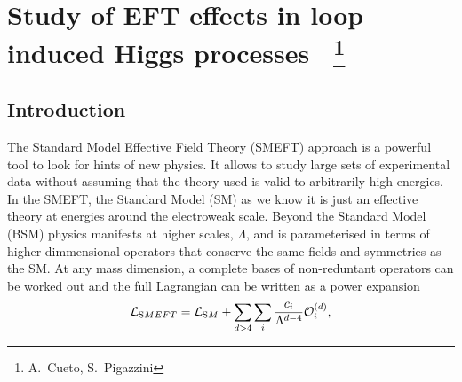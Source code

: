 \newcommand{\Herwig}{H\protect\scalebox{0.8}{ERWIG}\xspace}
\newcommand{\Pythia}{P\protect\scalebox{0.8}{YTHIA}\xspace}
\newcommand{\Sherpa}{S\protect\scalebox{0.8}{HERPA}\xspace}
\newcommand{\Rivet}{R\protect\scalebox{0.8}{IVET}\xspace}
\newcommand{\Professor}{P\protect\scalebox{0.8}{ROFESSOR}\xspace}
\newcommand{\eps}{\varepsilon}
\newcommand{\mc}[1]{\mathcal{#1}}
\newcommand{\mr}[1]{\mathrm{#1}}
\newcommand{\mb}[1]{\mathbb{#1}}
\newcommand{\tm}[1]{\scalebox{0.95}{$#1$}}
\newcommand{\SMEFTsim}{\texttt{SMEFTsim}}
\newcommand{\SMEFTatNLO}{\texttt{SMEFT@NLO}}
\newcommand{\Madgraph}{M\protect\scalebox{0.8}{ADGRAPH}\xspace}
\section{Study of EFT effects in loop induced Higgs processes ~\protect\footnote{
  A.~Cueto,
  S.~Pigazzini}{}}

\label{sec:projname}



\subsection{Introduction}
\label{sec:higgseft:section1}
The Standard Model Effective Field Theory (SMEFT) approach is a powerful tool to look for hints of new physics. It allows to study large sets of experimental data without assuming that the theory used is valid to arbitrarily high energies. In the SMEFT, the Standard Model (SM) as we know it is just an effective theory at energies around the electroweak scale. Beyond the Standard Model (BSM) physics manifests at higher scales, $\Lambda$, and is parameterised in terms of higher-dimmensional operators that conserve the same fields and symmetries as the SM. At any mass dimension, a complete bases of non-reduntant operators can be worked out and the full Lagrangian can be written as a power expansion
\begin{equation}
\mathcal{L}_{\textrm SMEFT} = \mathcal{L}_{\textrm SM} + \sum_{d>4}\sum_{i}\frac{c_i}{\Lambda^{d-4}}\mathcal{O}_{i}^{(d)},
\end{equation}  

